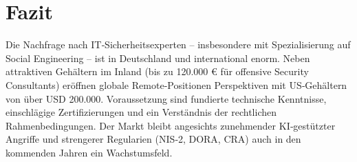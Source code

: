 \documentclass[10pt,a4paper]{article}
\begin{document}
	\section{Fazit}
	Die Nachfrage nach IT‑Sicherheitsexperten – insbesondere mit Spezialisierung auf Social Engineering – ist in Deutschland und international enorm. Neben attraktiven Gehältern im Inland (bis zu 120.000 € für offensive Security Consultants) eröffnen globale Remote‑Positionen Perspektiven mit US‑Gehältern von über USD 200.000. Voraussetzung sind fundierte technische Kenntnisse, einschlägige Zertifizierungen und ein Verständnis der rechtlichen Rahmenbedingungen. Der Markt bleibt angesichts zunehmender KI‑gestützter Angriffe und strengerer Regularien (NIS‑2, DORA, CRA) auch in den kommenden Jahren ein Wachstumsfeld.
	
\end{document}
